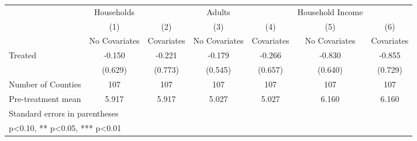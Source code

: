 {
\def\sym#1{\ifmmode^{#1}\else\(^{#1}\)\fi}
\begin{tabular}{l*{6}{c}}
\hline\hline
            &  Households   &               &      Adults   &               &Household Income   &               \\
            &\multicolumn{1}{c}{(1)}&\multicolumn{1}{c}{(2)}&\multicolumn{1}{c}{(3)}&\multicolumn{1}{c}{(4)}&\multicolumn{1}{c}{(5)}&\multicolumn{1}{c}{(6)}\\
            &\multicolumn{1}{c}{No Covariates}&\multicolumn{1}{c}{Covariates}&\multicolumn{1}{c}{No Covariates}&\multicolumn{1}{c}{Covariates}&\multicolumn{1}{c}{No Covariates}&\multicolumn{1}{c}{Covariates}\\
\hline
Treated     &      -0.150   &      -0.221   &      -0.179   &      -0.266   &      -0.830   &      -0.855   \\
            &     (0.629)   &     (0.773)   &     (0.545)   &     (0.657)   &     (0.640)   &     (0.729)   \\
\hline
Number of Counties&         107   &         107   &         107   &         107   &         107   &         107   \\
Pre-treatment mean&       5.917   &       5.917   &       5.027   &       5.027   &       6.160   &       6.160   \\
\hline\hline
\multicolumn{7}{l}{\footnotesize Standard errors in parentheses}\\
\multicolumn{7}{l}{\footnotesize * p<0.10, ** p<0.05, *** p<0.01}\\
\end{tabular}
}
